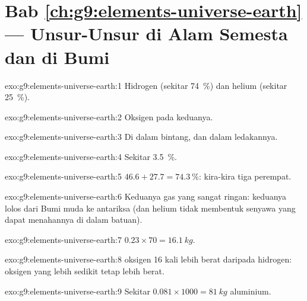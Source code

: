 \section*{Bab \ref{ch:g9:elements-universe-earth} --- Unsur-Unsur di Alam Semesta dan di Bumi}

\begin{solution}{exo:g9:elements-universe-earth:1}
Hidrogen (sekitar \qty{74}{\percent}) dan helium (sekitar
\qty{25}{\percent}).
\end{solution}

\begin{solution}{exo:g9:elements-universe-earth:2}
Oksigen pada keduanya.
\end{solution}

\begin{solution}{exo:g9:elements-universe-earth:3}
Di dalam bintang, dan dalam ledakannya.
\end{solution}

\begin{solution}{exo:g9:elements-universe-earth:4}
Sekitar \qty{3.5}{\percent}.
\end{solution}

\begin{solution}{exo:g9:elements-universe-earth:5}
$46.6 + 27.7 = \qty{74.3}{\percent}$: kira-kira tiga perempat.
\end{solution}

\begin{solution}{exo:g9:elements-universe-earth:6}
Keduanya gas yang sangat ringan: keduanya lolos dari Bumi muda ke
antariksa (dan helium tidak membentuk senyawa yang dapat menahannya di
dalam batuan).
\end{solution}

\begin{solution}{exo:g9:elements-universe-earth:7}
$0.23 \times 70 = \qty{16.1}{kg}$.
\end{solution}

\begin{solution}{exo:g9:elements-universe-earth:8}
 oksigen 16 kali lebih berat daripada  hidrogen:  oksigen
yang lebih sedikit tetap lebih berat.
\end{solution}

\begin{solution}{exo:g9:elements-universe-earth:9}
Sekitar $0.081 \times 1000 = \qty{81}{kg}$ aluminium.
\end{solution}

